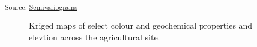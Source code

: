 \documentclass[
  number]{elsarticle}
\begin{document}
\begin{longtable}[]{@{}cccccccc@{}}
\end{longtable}

\textsubscript{Source:
\href{https://alex-koiter.github.io/spatial-variability-soil-manuscript/notebooks/semivariogram.qmd.html\#cell-tbl-geocol-semivariogram}{Semivariograms}}

\begin{figure}[H]


\caption{\label{fig-ag_map}Kriged maps of select colour and geochemical
properties and elevtion across the agricultural site.}

\end{figure}%
\end{document}
